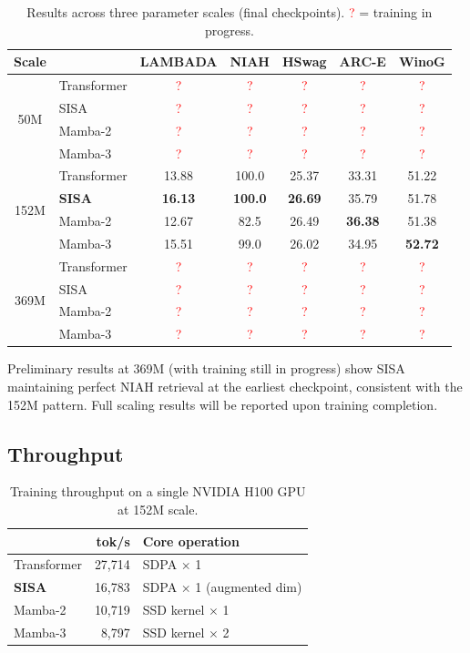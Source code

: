 \documentclass[11pt]{article}
\newcommand{\tbd}{\textcolor{red}{?}}
\begin{document}
\begin{table}[h]
\centering
\caption{Results across three parameter scales (final checkpoints). \tbd{} = training in progress.}
\label{tab:scaling}
\begin{tabular}{clccccc}
\toprule
\textbf{Scale} & & \textbf{LAMBADA} & \textbf{NIAH} & \textbf{HSwag} & \textbf{ARC-E} & \textbf{WinoG} \\
\midrule
\multirow{4}{*}{50M} & Transformer & \tbd & \tbd & \tbd & \tbd & \tbd \\
& SISA & \tbd & \tbd & \tbd & \tbd & \tbd \\
& Mamba-2 & \tbd & \tbd & \tbd & \tbd & \tbd \\
& Mamba-3 & \tbd & \tbd & \tbd & \tbd & \tbd \\
\midrule
\multirow{4}{*}{152M} & Transformer & 13.88 & 100.0 & 25.37 & 33.31 & 51.22 \\
& \textbf{SISA} & \textbf{16.13} & \textbf{100.0} & \textbf{26.69} & 35.79 & 51.78 \\
& Mamba-2 & 12.67 & 82.5 & 26.49 & \textbf{36.38} & 51.38 \\
& Mamba-3 & 15.51 & 99.0 & 26.02 & 34.95 & \textbf{52.72} \\
\midrule
\multirow{4}{*}{369M} & Transformer & \tbd & \tbd & \tbd & \tbd & \tbd \\
& SISA & \tbd & \tbd & \tbd & \tbd & \tbd \\
& Mamba-2 & \tbd & \tbd & \tbd & \tbd & \tbd \\
& Mamba-3 & \tbd & \tbd & \tbd & \tbd & \tbd \\
\bottomrule
\end{tabular}
\end{table}

Preliminary results at 369M (with training still in progress) show SISA maintaining perfect NIAH retrieval at the earliest checkpoint, consistent with the 152M pattern. Full scaling results will be reported upon training completion.

\subsection{Throughput}

\begin{table}[h]
\centering
\caption{Training throughput on a single NVIDIA H100 GPU at 152M scale.}
\label{tab:throughput}
\begin{tabular}{lrl}
\toprule
& \textbf{tok/s} & \textbf{Core operation} \\
\midrule
Transformer & 27,714 & SDPA $\times$ 1 \\
\textbf{SISA} & 16,783 & SDPA $\times$ 1 (augmented dim) \\
Mamba-2 & 10,719 & SSD kernel $\times$ 1 \\
Mamba-3 & 8,797 & SSD kernel $\times$ 2 \\
\bottomrule
\end{tabular}
\end{table}
\end{document}
